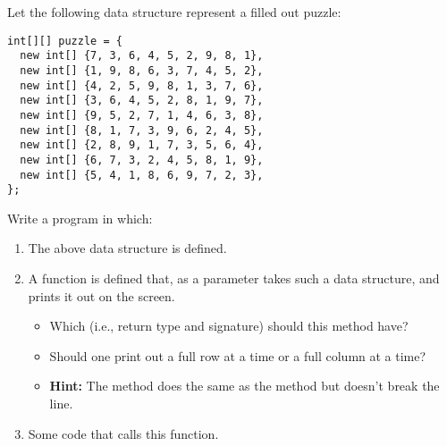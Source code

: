 Let the following data structure represent a filled out  puzzle:
\begin{verbatim}
﻿int[][] puzzle = {
  new int[] {7, 3, 6, 4, 5, 2, 9, 8, 1},
  new int[] {1, 9, 8, 6, 3, 7, 4, 5, 2},
  new int[] {4, 2, 5, 9, 8, 1, 3, 7, 6},
  new int[] {3, 6, 4, 5, 2, 8, 1, 9, 7},
  new int[] {9, 5, 2, 7, 1, 4, 6, 3, 8},
  new int[] {8, 1, 7, 3, 9, 6, 2, 4, 5},
  new int[] {2, 8, 9, 1, 7, 3, 5, 6, 4},
  new int[] {6, 7, 3, 2, 4, 5, 8, 1, 9},
  new int[] {5, 4, 1, 8, 6, 9, 7, 2, 3},
};
\end{verbatim}

Write a program in which:
\begin{enumerate}
  \item The above data structure is defined.
  \item A function is defined that, as a parameter takes such a data structure, and prints it out on the screen.
    \begin{itemize}
      \item Which  (i.e., return type and signature) should this method have?
      \item Should one print out a full row at a time or a full column at a time?
      \item \textbf{Hint:} The  method does the same as the  method but doesn't break the line.
    \end{itemize}
  \item Some code that calls this function.
\end{enumerate}
